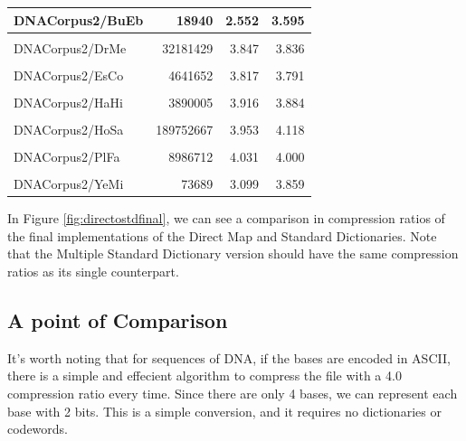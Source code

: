\documentclass[12pt,twoside]{reedthesis}
\begin{document}
\begin{table}[!h]
{\begin{tabular}[t]{l|r|r|r}
\hline
DNACorpus2/BuEb & 18940 & 2.552 & 3.595\\
\hline
\cellcolor{gray!6}{DNACorpus2/DaRe} & \cellcolor{gray!6}{62565020} & \cellcolor{gray!6}{3.928} & \cellcolor{gray!6}{4.013}\\
\hline
DNACorpus2/DrMe & 32181429 & 3.847 & 3.836\\
\hline
\cellcolor{gray!6}{DNACorpus2/EnIn} & \cellcolor{gray!6}{26403087} & \cellcolor{gray!6}{3.918} & \cellcolor{gray!6}{3.893}\\
\hline
DNACorpus2/EsCo & 4641652 & 3.817 & 3.791\\
\hline
\cellcolor{gray!6}{DNACorpus2/GaGa} & \cellcolor{gray!6}{148532294} & \cellcolor{gray!6}{3.776} & \cellcolor{gray!6}{3.943}\\
\hline
DNACorpus2/HaHi & 3890005 & 3.916 & 3.884\\
\hline
\cellcolor{gray!6}{DNACorpus2/HePy} & \cellcolor{gray!6}{1667825} & \cellcolor{gray!6}{3.884} & \cellcolor{gray!6}{3.894}\\
\hline
DNACorpus2/HoSa & 189752667 & 3.953 & 4.118\\
\hline
\cellcolor{gray!6}{DNACorpus2/OrSa} & \cellcolor{gray!6}{43262523} & \cellcolor{gray!6}{3.843} & \cellcolor{gray!6}{3.858}\\
\hline
DNACorpus2/PlFa & 8986712 & 4.031 & 4.000\\
\hline
\cellcolor{gray!6}{DNACorpus2/ScPo} & \cellcolor{gray!6}{10652155} & \cellcolor{gray!6}{3.847} & \cellcolor{gray!6}{3.813}\\
\hline
DNACorpus2/YeMi & 73689 & 3.099 & 3.859\\
\hline
\end{tabular}}
\end{table}
In Figure \ref{fig:directostdfinal}, we can see a comparison in compression ratios of the final implementations of the Direct Map and Standard Dictionaries. Note that the Multiple Standard Dictionary version should have the same compression ratios as its single counterpart.

\hypertarget{a-point-of-comparison}{%
\subsection{A point of Comparison}\label{a-point-of-comparison}}

It's worth noting that for sequences of DNA, if the bases are encoded in ASCII, there is a simple and effecient algorithm to compress the file with a 4.0 compression ratio every time. Since there are only 4 bases, we can represent each base with 2 bits. This is a simple conversion, and it requires no dictionaries or codewords.
\end{document}

